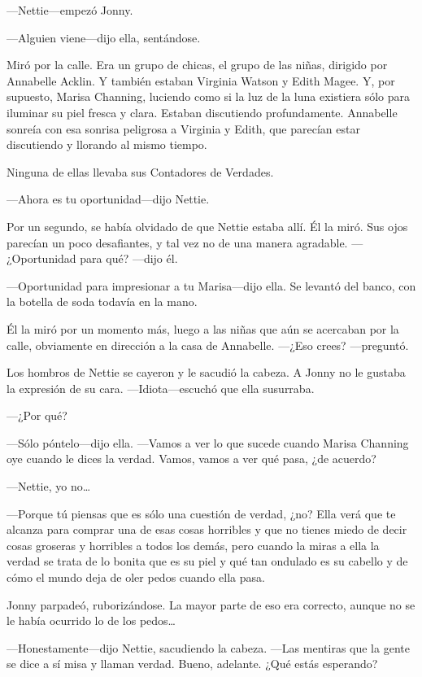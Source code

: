 ---Nettie---empezó Jonny.

---Alguien viene---dijo ella, sentándose.

Miró por la calle. Era un grupo de chicas, el grupo de las niñas,
dirigido por Annabelle Acklin. Y también estaban Virginia Watson y Edith
Magee. Y, por supuesto, Marisa Channing, luciendo como si la luz de la
luna existiera sólo para iluminar su piel fresca y clara. Estaban
discutiendo profundamente. Annabelle sonreía con esa sonrisa peligrosa a
Virginia y Edith, que parecían estar discutiendo y llorando al mismo
tiempo.

Ninguna de ellas llevaba sus Contadores de Verdades.

---Ahora es tu oportunidad---dijo Nettie.

Por un segundo, se había olvidado de que Nettie estaba allí. Él la miró.
Sus ojos parecían un poco desafiantes, y tal vez no de una manera
agradable. ---¿Oportunidad para qué? ---dijo él.

---Oportunidad para impresionar a tu Marisa---dijo ella. Se levantó del
banco, con la botella de soda todavía en la mano.

Él la miró por un momento más, luego a las niñas que aún se acercaban
por la calle, obviamente en dirección a la casa de Annabelle. ---¿Eso
crees? ---preguntó.

Los hombros de Nettie se cayeron y le sacudió la cabeza. A Jonny no le
gustaba la expresión de su cara. ---Idiota---escuchó que ella susurraba.

---¿Por qué?

---Sólo póntelo---dijo ella. ---Vamos a ver lo que sucede cuando Marisa
Channing oye cuando le dices la verdad. Vamos, vamos a ver qué pasa, ¿de
acuerdo?

---Nettie, yo no\ldots{}

---Porque tú piensas que es sólo una cuestión de verdad, ¿no? Ella verá
que te alcanza para comprar una de esas cosas horribles y que no tienes
miedo de decir cosas groseras y horribles a todos los demás, pero cuando
la miras a ella la verdad se trata de lo bonita que es su piel y qué tan
ondulado es su cabello y de cómo el mundo deja de oler pedos cuando ella
pasa.

Jonny parpadeó, ruborizándose. La mayor parte de eso era correcto,
aunque no se le había ocurrido lo de los pedos\ldots{}

---Honestamente---dijo Nettie, sacudiendo la cabeza. ---Las mentiras que
la gente se dice a sí misa y llaman verdad. Bueno, adelante. ¿Qué estás
esperando?

